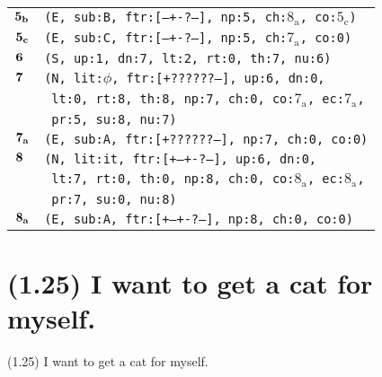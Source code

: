 \documentclass{article}
\begin{document}
\begin{minipage}{\textwidth}
{\begin{tabular}{|r|l|}
    ${\textbf{\textrm{5}}_{\textbf{\textrm{b}}}}$ & \texttt{\texttt{(E,~sub:B,~ftr:[---+-?---],~np:5,~ch:${\textrm{8}_{\textrm{a}}}$,~co:${\textrm{5}_{\textrm{c}}}$)}} \\
    ${\textbf{\textrm{5}}_{\textbf{\textrm{c}}}}$ & \texttt{\texttt{(E,~sub:C,~ftr:[---+-?---],~np:5,~ch:${\textrm{7}_{\textrm{a}}}$,~co:0)}} \\
    ${\textbf{\textrm{6}}_{\phantom{z}}}$ & \texttt{\texttt{(S,~up:1,~dn:7,~lt:2,~rt:0,~th:7,~nu:6)}} \\
    ${\textbf{\textrm{7}}_{\phantom{z}}}$ & \texttt{\texttt{(N,~lit:$\phi$,~ftr:[+??????--],~up:6,~dn:0,}} \\
    & \texttt{\texttt{~lt:0,~rt:8,~th:8,~np:7,~ch:0,~co:${\textrm{7}_{\textrm{a}}}$,~ec:${\textrm{7}_{\textrm{a}}}$,}} \\
    & \texttt{\texttt{~pr:5,~su:8,~nu:7)}} \\
    ${\textbf{\textrm{7}}_{\textbf{\textrm{a}}}}$ & \texttt{\texttt{(E,~sub:A,~ftr:[+??????--],~np:7,~ch:0,~co:0)}} \\
    ${\textbf{\textrm{8}}_{\phantom{z}}}$ & \texttt{\texttt{(N,~lit:it,~ftr:[+--+-?---],~up:6,~dn:0,}} \\
    & \texttt{\texttt{~lt:7,~rt:0,~th:0,~np:8,~ch:0,~co:${\textrm{8}_{\textrm{a}}}$,~ec:${\textrm{8}_{\textrm{a}}}$,}} \\
    & \texttt{\texttt{~pr:7,~su:0,~nu:8)}} \\
    ${\textbf{\textrm{8}}_{\textbf{\textrm{a}}}}$ & \texttt{\texttt{(E,~sub:A,~ftr:[+--+-?---],~np:8,~ch:0,~co:0)}} \\
    \hline
  \end{tabular}
  }
\end{minipage}
\bigbreak

\clearpage

%
%

\section*{(1.25) I want to get a cat for myself.}

\bigbreak
\begin{enumerate*}
\item[(1.25)] I want to get a cat for myself.
\end{enumerate*}
\bigbreak
\end{document}
